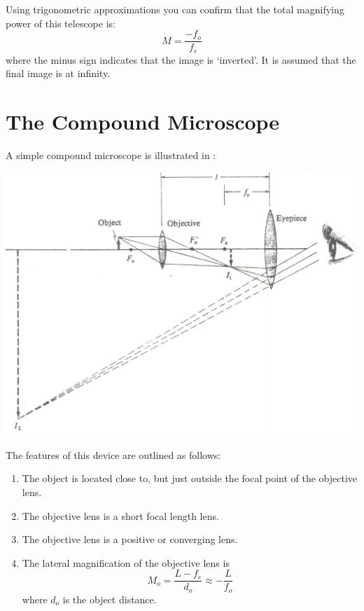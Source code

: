\begin{multicols}{2}
Using trigonometric approximations you can confirm that the total magnifying power of this telescope is:
\begin{equation}\label{e:tscope}
	M = \frac{-f_o}{f_e}
\end{equation}
where the minus sign indicates that the image is `inverted'. It is assumed that the final image is at infinity.

\section{The Compound Microscope}
A simple compound microscope is illustrated in :


\begin{center}
  \includegraphics[scale=0.6]{5bgraf/mscope}
  \label{f:mscope}
\end{center}


The features of this device are outlined as follows:
\begin{enumerate}
	\item The object is located close to, but just outside the focal point of the objective lens.
	\item The objective lens is a short focal length lens.
	\item The objective lens is a positive or converging lens. 
	\item The lateral magnification of the objective lens is
	\[
		M_o = \frac{L-f_e }{d_o}\approx -\frac{L}{f_o}
	\] 
	where $d_o$ is the object distance.
\end{enumerate}


\end{multicols}
